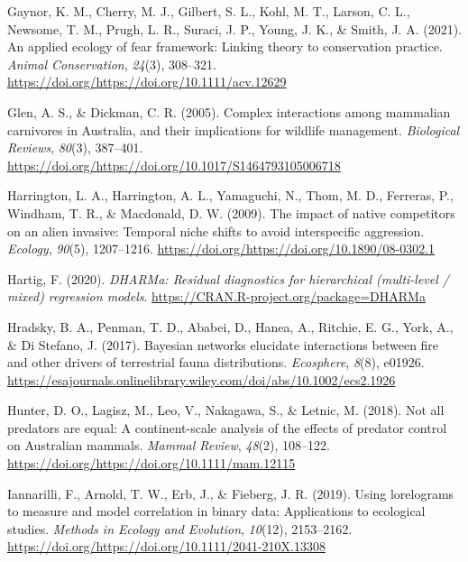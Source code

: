 \documentclass[]{elsarticle} %
\begin{document}
\leavevmode\hypertarget{ref-gaynor2021applied}{}%
Gaynor, K. M., Cherry, M. J., Gilbert, S. L., Kohl, M. T., Larson, C. L., Newsome, T. M., Prugh, L. R., Suraci, J. P., Young, J. K., \& Smith, J. A. (2021). An applied ecology of fear framework: Linking theory to conservation practice. \emph{Animal Conservation}, \emph{24}(3), 308--321. \url{https://doi.org/https://doi.org/10.1111/acv.12629}

\leavevmode\hypertarget{ref-glen2005complex}{}%
Glen, A. S., \& Dickman, C. R. (2005). Complex interactions among mammalian carnivores in Australia, and their implications for wildlife management. \emph{Biological Reviews}, \emph{80}(3), 387--401. \url{https://doi.org/https://doi.org/10.1017/S1464793105006718}

\leavevmode\hypertarget{ref-harrington2009impact}{}%
Harrington, L. A., Harrington, A. L., Yamaguchi, N., Thom, M. D., Ferreras, P., Windham, T. R., \& Macdonald, D. W. (2009). The impact of native competitors on an alien invasive: Temporal niche shifts to avoid interspecific aggression. \emph{Ecology}, \emph{90}(5), 1207--1216. \url{https://doi.org/https://doi.org/10.1890/08-0302.1}

\leavevmode\hypertarget{ref-DHARMa}{}%
Hartig, F. (2020). \emph{DHARMa: Residual diagnostics for hierarchical (multi-level / mixed) regression models}. \url{https://CRAN.R-project.org/package=DHARMa}

\leavevmode\hypertarget{ref-hradsky2017bayesian}{}%
Hradsky, B. A., Penman, T. D., Ababei, D., Hanea, A., Ritchie, E. G., York, A., \& Di Stefano, J. (2017). Bayesian networks elucidate interactions between fire and other drivers of terrestrial fauna distributions. \emph{Ecosphere}, \emph{8}(8), e01926. \url{https://esajournals.onlinelibrary.wiley.com/doi/abs/10.1002/ecs2.1926}

\leavevmode\hypertarget{ref-hunter2018not}{}%
Hunter, D. O., Lagisz, M., Leo, V., Nakagawa, S., \& Letnic, M. (2018). Not all predators are equal: A continent-scale analysis of the effects of predator control on Australian mammals. \emph{Mammal Review}, \emph{48}(2), 108--122. \url{https://doi.org/https://doi.org/10.1111/mam.12115}

\leavevmode\hypertarget{ref-iannarilli2019lorelograms}{}%
Iannarilli, F., Arnold, T. W., Erb, J., \& Fieberg, J. R. (2019). Using lorelograms to measure and model correlation in binary data: Applications to ecological studies. \emph{Methods in Ecology and Evolution}, \emph{10}(12), 2153--2162. \url{https://doi.org/https://doi.org/10.1111/2041-210X.13308}
\end{document}
